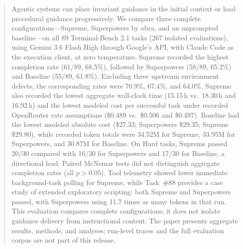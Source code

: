\begin{abstract}
Agentic systems can place invariant guidance in the initial context or load procedural guidance progressively. We compare three complete configurations---Supreme, Superpowers by obra, and an unprompted baseline---on all 89 Terminal-Bench 2.1 tasks (267 isolated evaluations), using Gemini 3.6 Flash High through Google's API, with Claude Code as the execution client, at zero temperature. Supreme recorded the highest completion rate (61/89, 68.5\%), followed by Superpowers (58/89, 65.2\%) and Baseline (55/89, 61.8\%). Excluding three upstream environment defects, the corresponding rates were 70.9\%, 67.4\%, and 64.0\%. Supreme also recorded the lowest aggregate wall-clock time (15.15\,h vs.\ 18.30\,h and 16.92\,h) and the lowest modeled cost per successful task under recorded OpenRouter rate assumptions (\$0.489 vs.\ \$0.506 and \$0.497). Baseline had the lowest modeled absolute cost (\$27.33; Superpowers \$29.35; Supreme \$29.80), while recorded token totals were 34.52M for Supreme, 33.95M for Superpowers, and 30.87M for Baseline. On Hard tasks, Supreme passed 20/30 compared with 16/30 for Superpowers and 17/30 for Baseline, a directional lead. Paired McNemar tests did not distinguish aggregate completion rates (all $p > 0.05$). Tool telemetry showed lower immediate background-task polling for Supreme, while Task~\#88 provides a case study of extended exploratory scripting: both Supreme and Superpowers passed, with Superpowers using 11.7 times as many tokens in that run. This evaluation compares complete configurations; it does not isolate guidance delivery from instructional content. The paper presents aggregate results, methods, and analyses; run-level traces and the full evaluation corpus are not part of this release.
\end{abstract}
